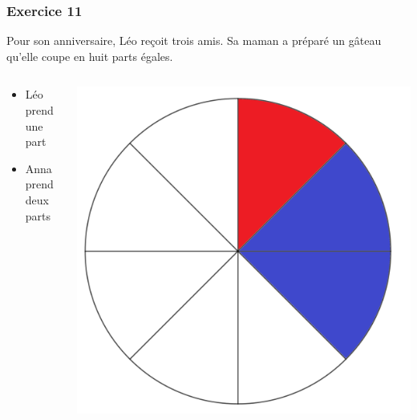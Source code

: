 \documentclass[xcolor={dvipsnames}]{beamer}
\begin{document}
\begin{frame}
	\frametitle{Exercice 11}
	
	Pour son anniversaire, Léo reçoit trois amis. Sa maman a préparé un gâteau qu'elle coupe en huit parts égales.
	
	
	\begin{columns}
		\begin{column}{0.5\textwidth}
			\begin{itemize}
				\item Léo prend une part
				\item Anna prend deux parts 
			\end{itemize}
		\end{column}
		\begin{column}{0.5\textwidth}
			\begin{center}
				\includegraphics[scale=0.08]{11_3}
			\end{center}
		\end{column}
	\end{columns}
	
\end{frame}
\end{document}
